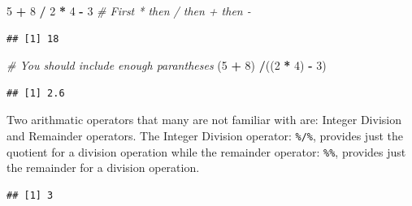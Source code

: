 \documentclass[]{krantz}
\makeatletter
\newenvironment{Shaded}{\begin{snugshade}}{\end{snugshade}}
\newcommand{\DecValTok}[1]{\textcolor[rgb]{0.06,0.06,0.06}{#1}}
\newcommand{\StringTok}[1]{\textcolor[rgb]{0.5,0.5,0.5}{#1}}
\newcommand{\CommentTok}[1]{\textcolor[rgb]{0.37,0.37,0.37}{\textit{#1}}}
\newcommand{\OperatorTok}[1]{\textcolor[rgb]{0.43,0.43,0.43}{\textbf{#1}}}
\newcommand{\NormalTok}[1]{#1}
\newenvironment{kframe}{%
\medskip{}
\setlength{\fboxsep}{.8em}
 \def\at@end@of@kframe{}%
 \ifinner\ifhmode%
  \def\at@end@of@kframe{\end{minipage}}%
  \begin{minipage}{\columnwidth}%
 \fi\fi%
 \def\FrameCommand##1{\hskip\@totalleftmargin \hskip-\fboxsep
 \colorbox{shadecolor}{##1}\hskip-\fboxsep
     \hskip-\linewidth \hskip-\@totalleftmargin \hskip\columnwidth}%
 \MakeFramed {\advance\hsize-\width
   \@totalleftmargin\z@ \linewidth\hsize
   \@setminipage}}%
 {\par\unskip\endMakeFramed%
 \at@end@of@kframe}
\renewenvironment{Shaded}{\begin{kframe}}{\end{kframe}}
\makeatother
\begin{document}
\begin{Shaded}
\begin{Highlighting}[]
\DecValTok{5} \OperatorTok{+}\StringTok{ }\DecValTok{8} \OperatorTok{/}\StringTok{ }\DecValTok{2} \OperatorTok{*}\StringTok{ }\DecValTok{4} \OperatorTok{-}\StringTok{ }\DecValTok{3} \CommentTok{# First * then / then + then - }
\end{Highlighting}
\end{Shaded}

\begin{verbatim}
## [1] 18
\end{verbatim}

\begin{Shaded}
\begin{Highlighting}[]
\CommentTok{# You should include enough parantheses}
\NormalTok{(}\DecValTok{5} \OperatorTok{+}\StringTok{ }\DecValTok{8}\NormalTok{) }\OperatorTok{/}\NormalTok{((}\DecValTok{2} \OperatorTok{*}\StringTok{ }\DecValTok{4}\NormalTok{) }\OperatorTok{-}\StringTok{ }\DecValTok{3}\NormalTok{)}
\end{Highlighting}
\end{Shaded}

\begin{verbatim}
## [1] 2.6
\end{verbatim}

Two arithmatic operators that many are not familiar with are: Integer
Division and Remainder operators. The Integer Division operator:
\texttt{\%/\%}, provides just the quotient for a division operation
while the remainder operator: \texttt{\%\%}, provides just the remainder
for a division operation.

\begin{Shaded}
\end{Shaded}

\begin{verbatim}
## [1] 3
\end{verbatim}

\begin{Shaded}
\end{Shaded}
\end{document}
